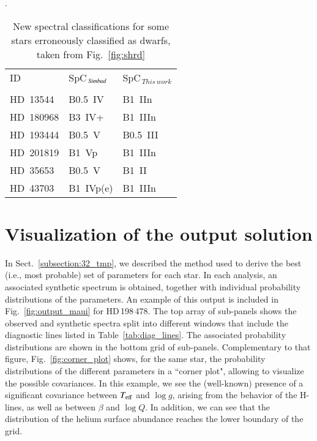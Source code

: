 \documentclass{aa}
\newcommand{\Teff}{\mbox{$T_{\rm eff}$}\xspace}
\newcommand{\logg}{\mbox{$\log g$}\xspace}
\newcommand{\logQ}{\mbox{$\log Q$}\xspace}
\begin{document}
\begin{appendix}
\begin{table}[ht]
\caption{New spectral classifications for some stars erroneously classified as dwarfs, taken from Fig.~\ref{fig:shrd}}.
\label{tab:newclass_dwarfs}
    \centering
    \begin{tabular}{lll}
        \hline\hline\noalign{\medskip}
        ID & SpC$_{\textit{\,Simbad}}$ & SpC$_{\,This\,work}$ \\
        \noalign{\vspace{0.2cm}}\hline\noalign{\smallskip}
        \multicolumn{3}{c}{Stars erroneously classified as dwarfs}\\
        \noalign{\smallskip}\hline\noalign{\smallskip\smallskip}\smallskip
        HD~13544   & B0.5~IV  & B1~IIn     \\\smallskip %
        HD~180968  & B3~IV+   & B1~IIIn    \\\smallskip %
        HD~193444  & B0.5~V   & B0.5~III   \\\smallskip %
        HD~201819  & B1~Vp    & B1~IIIn    \\\smallskip %
        HD~35653   & B0.5~V   & B1~II      \\\smallskip %
        HD~43703   & B1~IVp(e)& B1~IIIn    \\ %
        \hline
    \end{tabular}
\end{table}






\section{Visualization of the output solution}
\label{apen.output_maui}

In Sect.~\ref{subsection:32_tmp}, we described the method used to derive the best (i.e., most probable) set of parameters for each star. In each analysis, an associated synthetic spectrum is obtained, together with individual probability distributions of the parameters. An example of this output is included in Fig.~\ref{fig:output_maui} for HD\,198\,478. The top array of sub-panels shows the observed and synthetic spectra split into different windows that include the diagnostic lines listed in Table~\ref{tab:diag_lines}. The associated probability distributions are shown in the bottom grid of sub-panels. Complementary to that figure, Fig.~\ref{fig:corner_plot} shows, for the same star, the probability distributions of the different parameters in a ``corner plot", allowing to visualize the possible covariances. In this example, we see the (well-known) presence of a significant covariance between \Teff and \logg, arising from the behavior of the H-lines, as well as between $\beta$ and \logQ \citep[see][]{markova04}. In addition, we can see that the distribution of the helium surface abundance reaches the lower boundary of the grid.


\end{appendix}
\end{document}

